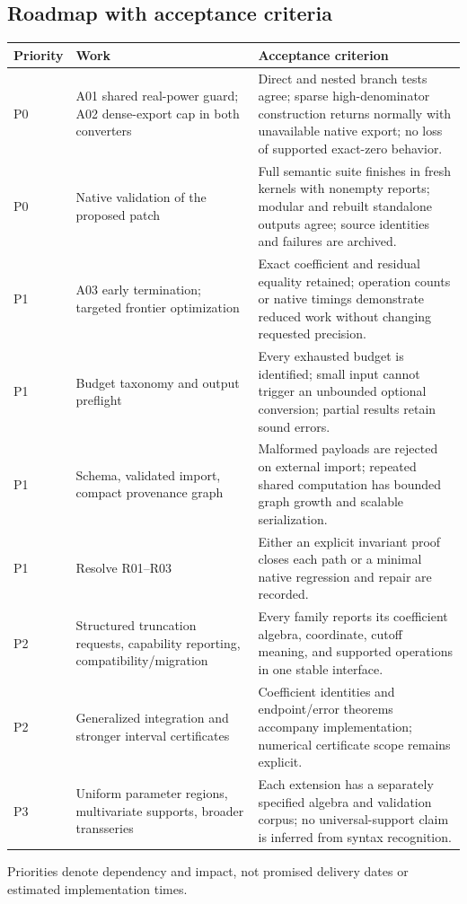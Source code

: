 \documentclass[11pt,letterpaper]{article}
\begin{document}
\subsection{Roadmap with acceptance criteria}
\begin{longtable}{@{}p{}p{}p{}@{}}
\toprule
Priority & Work & Acceptance criterion\\
\midrule\endhead
P0 & A01 shared real-power guard; A02 dense-export cap in both converters & Direct and nested branch tests agree; sparse high-denominator construction returns normally with unavailable native export; no loss of supported exact-zero behavior.\\
P0 & Native validation of the proposed patch & Full semantic suite finishes in fresh kernels with nonempty reports; modular and rebuilt standalone outputs agree; source identities and failures are archived.\\
P1 & A03 early termination; targeted frontier optimization & Exact coefficient and residual equality retained; operation counts or native timings demonstrate reduced work without changing requested precision.\\
P1 & Budget taxonomy and output preflight & Every exhausted budget is identified; small input cannot trigger an unbounded optional conversion; partial results retain sound errors.\\
P1 & Schema, validated import, compact provenance graph & Malformed payloads are rejected on external import; repeated shared computation has bounded graph growth and scalable serialization.\\
P1 & Resolve R01--R03 & Either an explicit invariant proof closes each path or a minimal native regression and repair are recorded.\\
P2 & Structured truncation requests, capability reporting, compatibility/migration & Every family reports its coefficient algebra, coordinate, cutoff meaning, and supported operations in one stable interface.\\
P2 & Generalized integration and stronger interval certificates & Coefficient identities and endpoint/error theorems accompany implementation; numerical certificate scope remains explicit.\\
P3 & Uniform parameter regions, multivariate supports, broader transseries & Each extension has a separately specified algebra and validation corpus; no universal-support claim is inferred from syntax recognition.\\
\bottomrule
\end{longtable}
Priorities denote dependency and impact, not promised delivery dates or estimated implementation times.
\end{document}
